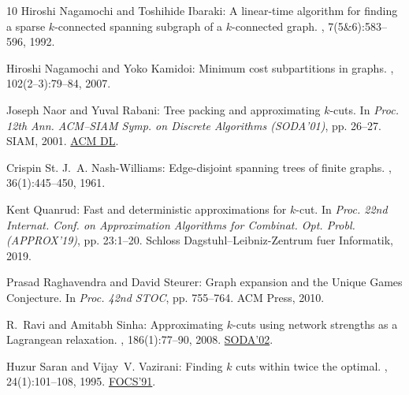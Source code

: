 \documentclass[11pt]{article}
\numberwithin{equation}{section}
\theoremstyle{definition}
\theoremstyle{plain}
\begin{document}
\begin{thebibliography}{10}
{\sc Hiroshi Nagamochi and Toshihide Ibaraki}: A linear-time algorithm for
  finding a sparse $k$-connected spanning subgraph of a $k$-connected graph.
, 7(5{\&}6):583--596, 1992.
\newblock [\epfmtdoi{10.1007/BF01758778}]

{\sc Hiroshi Nagamochi and Yoko Kamidoi}: Minimum cost subpartitions in graphs.
, 102(2--3):79--84, 2007.

{\sc Joseph Naor and Yuval Rabani}: Tree packing and approximating $k$-cuts.
\newblock In {\em Proc. 12th Ann. ACM--SIAM Symp. on Discrete Algorithms
  (SODA'01)}, pp. 26--27. SIAM, 2001.
\newblock \href{http://dl.acm.org/doi/10.5555/365411.365415}{ACM DL}.

{\sc Crispin St. J.~A. Nash{-}Williams}: Edge-disjoint spanning trees of finite
  graphs.
, 36(1):445--450, 1961.

{\sc Kent Quanrud}: Fast and deterministic approximations for $k$-cut.
\newblock In {\em Proc. 22nd Internat. Conf. on Approximation Algorithms for
  Combinat. Opt. Probl. (APPROX'19)}, pp. 23:1--20. Schloss
  Dagstuhl--Leibniz-Zentrum fuer Informatik, 2019.

{\sc Prasad Raghavendra and David Steurer}: Graph expansion and the {U}nique
  {G}ames {C}onjecture.
\newblock In {\em Proc. 42nd STOC}, pp. 755--764. ACM Press, 2010.
\newblock [\epfmtdoi{10.1145/1806689.1806792}]

{\sc R.~Ravi and Amitabh Sinha}: Approximating $k$-cuts using network strengths
  as a {Lagrangean} relaxation.
, 186(1):77--90, 2008.
\newblock \prelim \href{https://dl.acm.org/doi/10.5555/545381.545463}{SODA'02}.

{\sc Huzur Saran and Vijay~V. Vazirani}: Finding $k$ cuts within twice the
  optimal.
, 24(1):101--108, 1995.
\newblock \prelim \href{https://doi.org/10.1109/SFCS.1991.185443}{FOCS'91}.
\newblock [\epfmtdoi{10.1137/S0097539792251730}]


\end{thebibliography}
\end{document}
